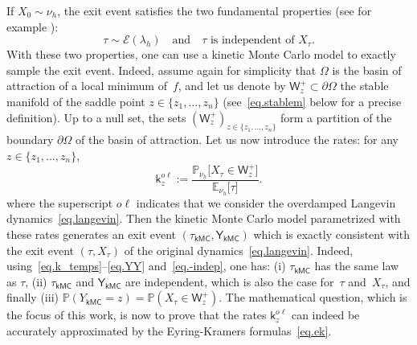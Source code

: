 \documentclass[JEP,XML,SOM,Unicode,NoEqCountersInSection,NoFloatCountersInSection,published]{cedram}
\newcommand{\quand}{\quad\text{and}\quad}
\theoremstyle{plain}
\theoremstyle{definition}
\begin{document}
If $X_0\sim \nu_h$, the exit event satisfies the two fundamental properties (see
for example \cite[Prop.\,2.4]{le2012mathematical}):
\begin{equation}\label{eq.-indep}
\tau\sim\mathcal E(\lambda_h) \quand \tau \text{ is independent of } X_{\tau}.
\end{equation}
With these two properties, one can use a kinetic Monte Carlo model to
exactly sample the exit event. Indeed, assume again for simplicity that $\Omega$ is
the basin of attraction of a local minimum of~$f$, and let us denote
by $\mathsf W_z^+ \subset \partial \Omega$ the stable manifold of the
saddle point $z \in \{z_1, \dots, z_n\}$ (see~\eqref{eq.stablem} below
for a
precise definition). Up to a null set, the sets
$(\mathsf W_z^+)_{z \in \{z_1, \ldots, z_n\}}$ form a partition of the
boundary $\partial \Omega$ of the basin
of attraction. Let us now introduce the rates: for any $z \in
\{z_1, \ldots, z_n\}$,
\begin{equation}\label{eq:rates}
\mathsf k_{z}^{o\ell}:=\frac{\mathbb P_{\nu_{h}}\big [
X_{\tau} \in \mathsf W^+_{z} \big]}{\mathbb E_{\nu_{h}}\big [ \tau \big]}.
\end{equation}
where the superscript $o\ell$ indicates that we consider the
overdamped Langevin dynamics~\eqref{eq.langevin}. Then the kinetic
Monte Carlo model parametrized with these rates generates an exit event
$(\tau_{\mathsf {kMC}}, \mathsf Y_{\mathsf {kMC}})$ which is exactly
consistent with the exit event $(\tau,X_\tau)$ of the original
dynamics~\eqref{eq.langevin}. Indeed, using~\eqref{eq.k_temps}--\eqref{eq.YY}
and~\eqref{eq.-indep}, one has: (i) $\tau_{\mathsf {kMC}}$ has the same law as $\tau$,
(ii) $\tau_{\mathsf {kMC}}$ and $\mathsf Y_{\mathsf {kMC}}$ are
independent, which is also the case for~$\tau$ and~$X_\tau$, and finally (iii)
$\mathbb P(Y_{\mathsf {kMC}}=z)=\mathbb P(X_{\tau} \in \mathsf W^+_{z})$. The
mathematical question, which is the focus of this work, is now to
prove that the rates $\mathsf k_{z}^{o\ell}$ can indeed be accurately
approximated by the Eyring-Kramers formulas~\eqref{eq.ek}.
\end{document}
